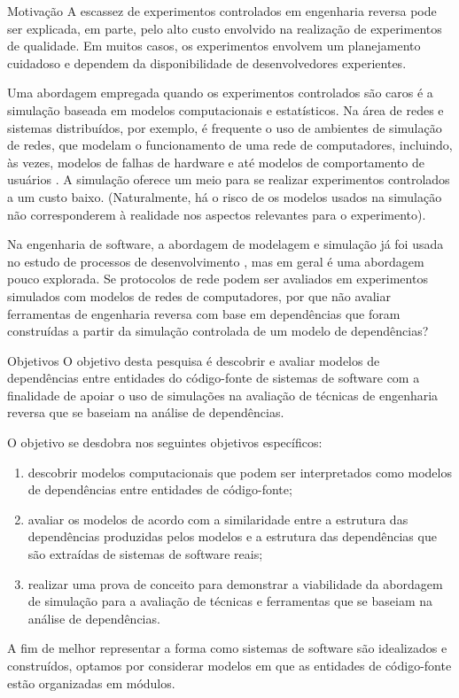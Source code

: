 \begin{section}{Motivação}
		A escassez de experimentos controlados em engenharia reversa pode ser explicada, em parte, pelo alto custo envolvido na realização de experimentos de qualidade. Em muitos casos, os experimentos envolvem um planejamento cuidadoso e dependem da disponibilidade de desenvolvedores experientes.

		Uma abordagem empregada quando os experimentos controlados são caros é a simulação baseada em modelos computacionais e estatísticos. Na área de redes e sistemas distribuídos, por exemplo, é frequente o uso de ambientes de simulação de redes, que modelam o funcionamento de uma rede de computadores, incluindo, às vezes, modelos de falhas de hardware e até modelos de comportamento de usuários \cite{White2002}. A simulação oferece um meio para se realizar experimentos controlados a um custo baixo. (Naturalmente, há o risco de os modelos usados na simulação não corresponderem à realidade nos aspectos relevantes para o experimento).

		Na engenharia de software, a abordagem de modelagem e simulação já foi usada no estudo de processos de desenvolvimento \cite{Stopford2008}, mas em geral é uma abordagem pouco explorada. Se protocolos de rede podem ser avaliados em experimentos simulados com modelos de redes de computadores, por que não avaliar ferramentas de engenharia reversa com base em dependências que foram construídas a partir da simulação controlada de um modelo de dependências?
		
\end{section}

\begin{section}{Objetivos}
	O objetivo desta pesquisa é descobrir e avaliar modelos de dependências entre entidades do código-fonte de sistemas de software com a finalidade de apoiar o uso de simulações na avaliação de técnicas de engenharia reversa que se baseiam na análise de dependências.
	
	O objetivo se desdobra nos seguintes objetivos específicos:
	
	\begin{enumerate}
		\item descobrir modelos computacionais que podem ser interpretados como modelos de dependências entre entidades de código-fonte;
		\item avaliar os modelos de acordo com a similaridade entre a estrutura das dependências produzidas pelos modelos e a estrutura das dependências que são extraídas de sistemas de software reais;
		\item realizar uma prova de conceito para demonstrar a viabilidade da abordagem de simulação para a avaliação de técnicas e ferramentas que se baseiam na análise de dependências.
	\end{enumerate}
	
	A fim de melhor representar a forma como sistemas de software são idealizados e construídos, optamos por considerar modelos em que as entidades de código-fonte estão organizadas em módulos. %
	
\end{section}

